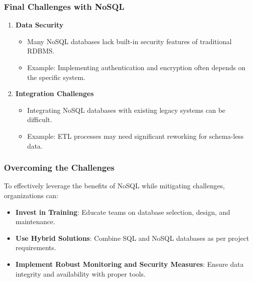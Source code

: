 \documentclass[aspectratio=169]{beamer}
\begin{document}
\begin{frame}[fragile]
    \frametitle{Final Challenges with NoSQL}
    
    \begin{enumerate}[resume]
        \item \textbf{Data Security}
            \begin{itemize}
                \item Many NoSQL databases lack built-in security features of traditional RDBMS.
                \item Example: Implementing authentication and encryption often depends on the specific system.
            \end{itemize}
        
        \item \textbf{Integration Challenges}
            \begin{itemize}
                \item Integrating NoSQL databases with existing legacy systems can be difficult.
                \item Example: ETL processes may need significant reworking for schema-less data.
            \end{itemize}
    \end{enumerate}
\end{frame}

\begin{frame}[fragile]
    \frametitle{Overcoming the Challenges}
    
    To effectively leverage the benefits of NoSQL while mitigating challenges, organizations can:
    \begin{itemize}
        \item \textbf{Invest in Training}: Educate teams on database selection, design, and maintenance.
        \item \textbf{Use Hybrid Solutions}: Combine SQL and NoSQL databases as per project requirements.
        \item \textbf{Implement Robust Monitoring and Security Measures}: Ensure data integrity and availability with proper tools.
    \end{itemize}
\end{frame}
\end{document}
